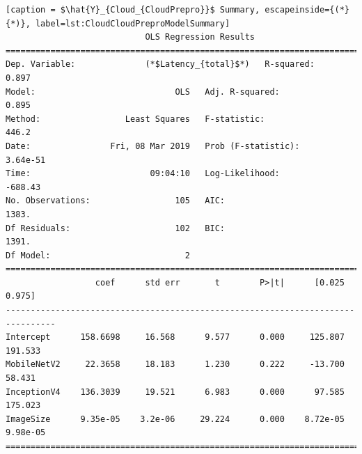 \begin{minipage}{\linewidth}
\begin{lstlisting}[caption = $\hat{Y}_{Cloud_{CloudPrepro}}$ Summary, escapeinside={(*}{*)}, label=lst:CloudCloudPreproModelSummary]
                            OLS Regression Results                            
==============================================================================
Dep. Variable:              (*$Latency_{total}$*)   R-squared:                       0.897
Model:                            OLS   Adj. R-squared:                  0.895
Method:                 Least Squares   F-statistic:                     446.2
Date:                Fri, 08 Mar 2019   Prob (F-statistic):           3.64e-51
Time:                        09:04:10   Log-Likelihood:                -688.43
No. Observations:                 105   AIC:                             1383.
Df Residuals:                     102   BIC:                             1391.
Df Model:                           2                                         
================================================================================
                  coef      std err       t        P>|t|      [0.025      0.975]
--------------------------------------------------------------------------------
Intercept      158.6698     16.568      9.577      0.000     125.807     191.533
MobileNetV2     22.3658     18.183      1.230      0.222     -13.700      58.431
InceptionV4    136.3039     19.521      6.983      0.000      97.585     175.023
ImageSize      9.35e-05    3.2e-06     29.224      0.000    8.72e-05    9.98e-05
================================================================================
\end{lstlisting}
\end{minipage}